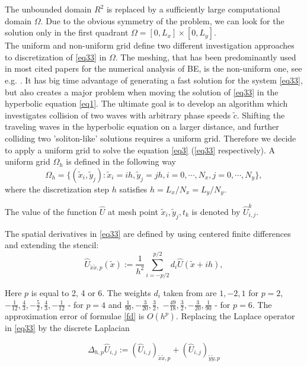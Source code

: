 \documentclass[12pt]{article}
\theoremstyle{theorem}
\theoremstyle{defi}
\begin{document}
The unbounded domain $R^2$ is replaced by a sufficiently large computational domain $\Omega$. Due to the obvious symmetry of the problem, we can look for the solution only in the first quadrant $\Omega = [0,L_x] \times[0,L_y]$.
\\
The uniform and non-uniform grid define two different investigation approaches to discretization of \eqref{eq33} in $\Omega$. The meshing, that has been predominantly used in most cited papers for the numerical analysis of BE, is the non-uniform one, see e.g. \cite{ref6}. It has big time advantage of generating a fast solution for the system \eqref{eq33}, but also creates a major problem when moving the solution of \eqref{eq33} in the hyperbolic equation \eqref{eq1}. The ultimate goal is to develop an algorithm which investigates collision of two waves with arbitrary phase speeds $\tilde c$. Shifting the traveling waves in the hyperbolic equation on a larger distance, and further colliding two 'soliton-like' solutions requires a uniform grid. Therefore we decide to apply a uniform grid to solve the equation \eqref{eq3} (\eqref{eq33} respectively).
A uniform grid $\Omega_h$ is defined in the following way
$$
\Omega_h = \{(\tilde x_i, \tilde y_j): \tilde x_i = ih, \tilde y_j = jh, i = 0,\cdots ,N_x, j = 0,\cdots , N_y \},
$$
where the discretization step $h$ satisfies
$ h = L_x/N_x = L_y/N_y$. 

The value of the function $\widehat U$ at mesh point $\tilde x_i,\tilde y_j,t_k$ is denoted by $\widehat U_{i,j}^k$.

\par
The spatial derivatives in \eqref{eq33} are defined by using centered finite differences  
and extending the stencil:
\begin{equation}\label{fd}
\widehat U_{{\tilde x \tilde x},p}(\tilde x) :=  \frac{1}{h^2} \sum\limits_{i=-p/2}^{p/2} d_i \widehat U(\tilde x+ih),
\end{equation}

Here $p$ is equal to 2, 4 or 6.  The weights $d_i$ taken from  \cite{ref17} are  
 $ 1,-2,1$ for $p=2$, 
$-\frac{1}{12}, \frac{4}{3}, -\frac{5}{2}, \frac{4}{3}, -\frac{1}{12}$ - for $p=4$
 and 
$\frac{1}{90}, -\frac{3}{20}, \frac{3}{2},$ $ -\frac{49}{18}, \frac{3}{2}, -\frac{3}{20}, \frac{1}{90}$ - for $p=6$. The approximation error of  formulae \eqref{fd} is $O(h^p)$. Replacing the Laplace operator in \eqref{eq33} by the discrete Laplacian 

$$ \Delta_{h,p} \widehat U_{i,j} := (\widehat U_{i,j})_{{\tilde x \tilde x},p} + (\widehat U_{i,j})_{{\tilde y \tilde y},p}$$ 
\end{document}
